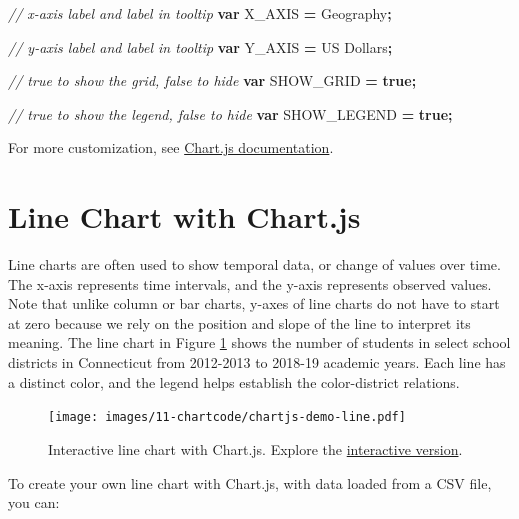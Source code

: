 \documentclass[
  english,
]{book}
\newenvironment{Shaded}{\begin{snugshade}}{\end{snugshade}}
\newcommand{\CommentTok}[1]{\textcolor[rgb]{0.56,0.35,0.01}{\textit{#1}}}
\newcommand{\KeywordTok}[1]{\textcolor[rgb]{0.13,0.29,0.53}{\textbf{#1}}}
\newcommand{\NormalTok}[1]{#1}
\newcommand{\OperatorTok}[1]{\textcolor[rgb]{0.81,0.36,0.00}{\textbf{#1}}}
\newcommand{\StringTok}[1]{\textcolor[rgb]{0.31,0.60,0.02}{#1}}
\begin{document}
\begin{Shaded}
\begin{Highlighting}[]
\CommentTok{// x{-}axis label and label in tooltip}
\KeywordTok{var}\NormalTok{ X\_AXIS }\OperatorTok{=} \StringTok{\textquotesingle{}Geography\textquotesingle{}}\OperatorTok{;}

\CommentTok{// y{-}axis label and label in tooltip}
\KeywordTok{var}\NormalTok{ Y\_AXIS }\OperatorTok{=} \StringTok{\textquotesingle{}US Dollars\textquotesingle{}}\OperatorTok{;}

\CommentTok{// \textasciigrave{}true\textasciigrave{} to show the grid, \textasciigrave{}false\textasciigrave{} to hide}
\KeywordTok{var}\NormalTok{ SHOW\_GRID }\OperatorTok{=} \KeywordTok{true}\OperatorTok{;}

\CommentTok{// \textasciigrave{}true\textasciigrave{} to show the legend, \textasciigrave{}false\textasciigrave{} to hide}
\KeywordTok{var}\NormalTok{ SHOW\_LEGEND }\OperatorTok{=} \KeywordTok{true}\OperatorTok{;}
\end{Highlighting}
\end{Shaded}

For more customization, see \href{https://www.chartjs.org/docs/latest/}{Chart.js documentation}.

\hypertarget{chartjs-line}{%
\section*{Line Chart with Chart.js}\label{chartjs-line}}

Line charts are often used to show temporal data, or change of values over time.
The x-axis represents time intervals, and the y-axis represents observed values.
Note that unlike column or bar charts, y-axes of line charts do not have to start at zero because we rely on the position and slope of the line to interpret its meaning.
The line chart in Figure \ref{fig:chartjs-demo-line} shows the number of students
in select school districts in Connecticut from 2012-2013 to 2018-19 academic years.
Each line has a distinct color, and the legend helps establish the color-district relations.



\begin{figure}
\centering
\texttt{[image: images/11-chartcode/chartjs-demo-line.pdf]}
\caption{\label{fig:chartjs-demo-line}Interactive line chart with Chart.js. Explore the \href{https://handsondataviz.github.io/chartjs-line/}{interactive version}.}
\end{figure}

To create your own line chart with Chart.js, with data loaded from a CSV file, you can:
\end{document}
